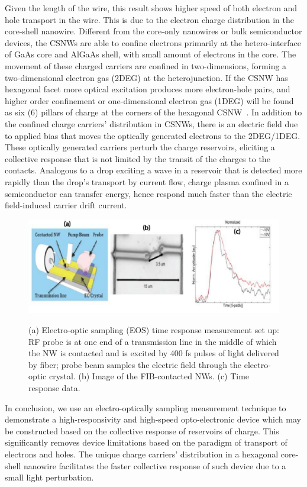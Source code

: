 Given the length of the wire, this result shows higher speed of both electron
and hole transport in the wire. This is due to the electron charge distribution
in the core-shell nanowire. Different from the core-only nanowires or bulk
semiconductor devices, the CSNWs are able to confine electrons primarily at the
hetero-interface of GaAs core and AlGaAs shell, with small amount of electrons
in the core. The movement of these charged carriers are confined in
two-dimensions, forming a two-dimensional electron gas (2DEG) at the
heterojunction. If the CSNW has hexagonal facet more optical excitation
produces more electron-hole pairs, and higher order confinement or
one-dimensional electron gas (1DEG) will be found as six (6) pillars of charge
at the corners of the hexagonal CSNW~\cite{Wang:2015hz}. In addition to the
confined charge carriers' distribution in CSNWs, there is an electric field due
to applied bias that moves the optically generated electrons to the 2DEG/1DEG.
These optically generated carriers perturb the charge reservoirs, eliciting a
collective response that is not limited by the transit of the charges to the
contacts. Analogous to a drop exciting a wave in a reservoir that is detected
more rapidly than the drop's transport by current flow, charge plasma confined
in a semiconductor can transfer energy, hence respond much faster than the
electric field-induced carrier drift current.

\begin{figure}
  \caption{(a) Electro-optic sampling (EOS) time response measurement set up: RF probe is at one end of a transmission line in the middle of which the NW is contacted and is excited by 400 fs pulses of light delivered by fiber; probe beam samples the electric field through the electro-optic crystal. (b) Image of the FIB-contacted NWs. (c) Time response data.}
  \centering
  \includegraphics[width=\textwidth]{pictures/Data/NWEOS}
  \label{NWEOS}
\end{figure}

In conclusion, we use an electro-optically sampling measurement technique to
demonstrate a high-responsivity and high-speed opto-electronic device which may
be constructed based on the collective response of reservoirs of charge. This
significantly removes device limitations based on the paradigm of transport of
electrons and holes.  The unique charge carriers' distribution in a hexagonal
core-shell nanowire facilitates the faster collective response of such device
due to a small light perturbation.


